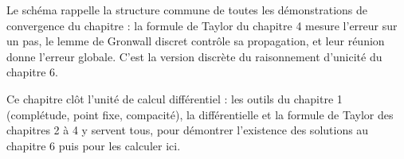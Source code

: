 \documentclass[a4paper,twoside]{report}
\begin{document}
\begin{center}
\end{center}

\noindent Le schéma rappelle la structure commune de toutes les démonstrations de convergence du chapitre : la formule de Taylor du chapitre 4 mesure l'erreur sur un pas, le lemme de Gronwall discret contrôle sa propagation, et leur réunion donne l'erreur globale. C'est la version discrète du raisonnement d'unicité du chapitre 6.

\medskip
\noindent Ce chapitre clôt l'unité de calcul différentiel : les outils du chapitre 1 (complétude, point fixe, compacité), la différentielle et la formule de Taylor des chapitres 2 à 4 y servent tous, pour démontrer l'existence des solutions au chapitre 6 puis pour les calculer ici.
\end{document}

